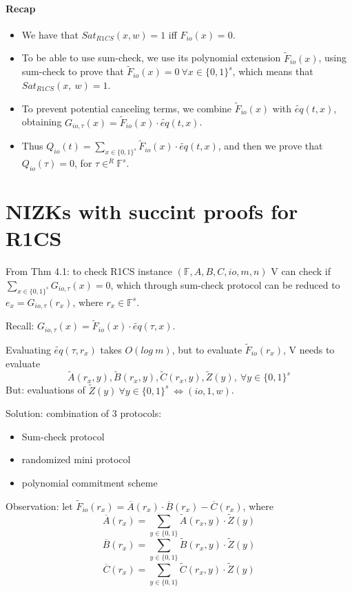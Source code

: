 \documentclass{article}
\theoremstyle{definition}
\begin{document}
\paragraph{Recap}
\begin{itemize}
	\item[] We have that $Sat_{R1CS}(x,w)=1$ iff $F_{io}(x)=0$.
	\item[] To be able to use sum-check, we use its polynomial extension $\widetilde{F}_{io}(x)$, using sum-check to prove that $\widetilde{F}_{io}(x) =0 ~\forall x \in \{0, 1\}^s$, which means that $Sat_{R1CS}(x,~w)=1$.
	\item[] To prevent potential canceling terms, we combine $\widetilde{F}_{io}(x)$ with $\widetilde{eq}(t, x)$, obtaining $G_{io, \tau}(x)= \widetilde{F}_{io}(x) \cdot \widetilde{eq}(t, x)$.
	\item[] Thus $Q_{io}(t)= \sum_{x \in \{0,1\}^s} \widetilde{F}_{io}(x) \cdot \widetilde{eq}(t, x)$, and then we prove that $Q_{io}(\tau)=0$, for $\tau \in^R \mathbb{F}^s$.
\end{itemize}

\section{NIZKs with succint proofs for R1CS}

From Thm 4.1: to check R1CS instance $(\mathbb{F}, A, B, C, io, m, n)$ V can check if
$\sum_{x \in \{0,1\}^s} G_{io, \tau} (x) = 0$, which through sum-check protocol can be reduced to $e_x = G_{io, \tau} (r_x)$, where $r_x \in \mathbb{F}^s$.

Recall: $G_{io, \tau}(x) = \widetilde{F}_{io}(x) \cdot \widetilde{eq}(\tau, x)$.

Evaluating $\widetilde{eq}(\tau, r_x)$ takes $O(log~m)$, but to evaluate $\widetilde{F}_{io}(r_x)$, V needs to evaluate
$$\widetilde{A}(r_x, y), \widetilde{B}(r_x, y), \widetilde{C}(r_x, y), \widetilde{Z}(y),~ \forall y \in \{0,1\}^s$$
But: evaluations of $\widetilde{Z}(y) ~\forall y \in \{0,1\}^s ~\Longleftrightarrow (io, 1, w)$.

Solution: combination of 3 protocols:
\begin{itemize}
	\item Sum-check protocol
	\item randomized mini protocol
	\item polynomial commitment scheme
\end{itemize}

Observation: let $\widetilde{F}_{io}(r_x) = \overline{A}(r_x) \cdot \overline{B}(r_x) - \overline{C}(r_x)$, where
$$\overline{A}(r_x) = \sum_{y \in \{0,1\}} \widetilde{A}(r_x, y) \cdot \widetilde{Z}(y)$$
$$\overline{B}(r_x) = \sum_{y \in \{0,1\}} \widetilde{B}(r_x, y) \cdot \widetilde{Z}(y)$$
$$\overline{C}(r_x) = \sum_{y \in \{0,1\}} \widetilde{C}(r_x, y) \cdot \widetilde{Z}(y)$$
\end{document}
